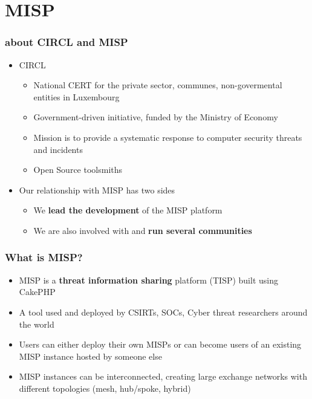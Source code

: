 
\begin{frame}[t,plain]
\titlepage
\end{frame}

\section{MISP}

\begin{frame}
    \frametitle{about CIRCL and MISP}
    \begin{itemize}
        \item CIRCL
        \begin{itemize}
            \item National CERT for the private sector, communes, non-govermental entities in Luxembourg
            \item Government-driven initiative, funded by the Ministry of Economy
            \item Mission is to provide a systematic response to computer security threats and incidents
            \item Open Source toolsmiths
        \end{itemize}
        \item Our relationship with MISP has two sides
        \begin{itemize}
            \item We {\bf lead the development} of the MISP platform
            \item We are also involved with and {\bf run several communities}
        \end{itemize}
    \end{itemize}
\end{frame}

\begin{frame}
\frametitle{What is MISP?}
\begin{itemize}
       \item MISP is a {\bf threat information sharing} platform (TISP) built using CakePHP
       \item A tool used and deployed by CSIRTs, SOCs, Cyber threat researchers around the world
       \item Users can either deploy their own MISPs or can become users of an existing MISP instance hosted by someone else
       \item MISP instances can be interconnected, creating large exchange networks with different topologies (mesh, hub/spoke, hybrid)
\end{itemize}
\end{frame}

